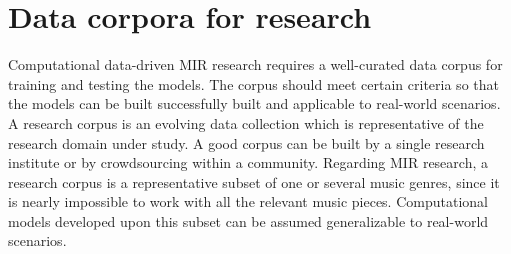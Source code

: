\chapter{Data corpora for research}\label{chap:datasets}
%

Computational data-driven MIR research requires a well-curated data corpus for training and testing the models. The corpus should meet certain criteria so that the models can be built successfully built and applicable to real-world scenarios. A research corpus is an evolving data collection which is representative of the research domain under study. A good corpus can be built by a single research institute or by crowdsourcing within a community. Regarding MIR research, a research corpus is a representative subset of one or several music genres, since it is nearly impossible to work with all the relevant music pieces. Computational models developed upon this subset can be assumed generalizable to real-world scenarios.

